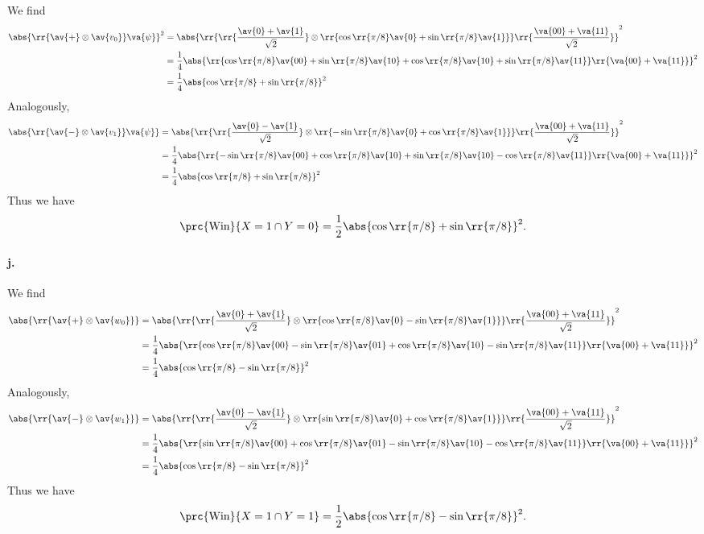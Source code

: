 \documentclass{article}
\begin{document}
We find
\begin{align*}
  \abs{\rr{\av{+}\otimes \av{v_0}}\va{\psi}}^2
  &= \abs{\rr{\rr{\frac{\av{0}+\av{1}}{\sqrt{2}}}\otimes\rr{\cos\rr{\pi/8}\av{0}+\sin\rr{\pi/8}\av{1}}}\rr{\frac{\va{00}+\va{11}}{\sqrt{2}}}}^2 \\
  &= \frac{1}{4}\abs{\rr{\cos\rr{\pi/8}\av{00} + \sin\rr{\pi/8}\av{10} + \cos\rr{\pi/8}\av{10}+\sin\rr{\pi/8}\av{11}}\rr{\va{00}+\va{11}}}^2 \\
  &= \frac{1}{4}\abs{\cos\rr{\pi/8}+\sin\rr{\pi/8}}^2 \\
\end{align*}
Analogously,
\begin{align*}
  \abs{\rr{\av{-}\otimes \av{v_1}}\va{\psi}}
  &= \abs{\rr{\rr{\frac{\av{0}-\av{1}}{\sqrt{2}}}\otimes\rr{-\sin\rr{\pi/8}\av{0}+\cos\rr{\pi/8}\av{1}}}\rr{\frac{\va{00}+\va{11}}{\sqrt{2}}}}^2 \\
  &= \frac{1}{4}\abs{\rr{-\sin\rr{\pi/8}\av{00} + \cos\rr{\pi/8}\av{10} + \sin\rr{\pi/8}\av{10}-\cos\rr{\pi/8}\av{11}}\rr{\va{00}+\va{11}}}^2 \\
  &= \frac{1}{4}\abs{\cos\rr{\pi/8}+\sin\rr{\pi/8}}^2
\end{align*}
Thus we have
\begin{align*}
  \prc{\text{Win}}{X=1\cap Y=0} = \frac{1}{2}\abs{\cos\rr{\pi/8}+\sin\rr{\pi/8}}^2.
\end{align*}

\paragraph{j.}

We find
\begin{align*}
  \abs{\rr{\av{+}\otimes\av{w_0}}} &= \abs{\rr{\rr{\frac{\av{0}+\av{1}}{\sqrt{2}}}\otimes\rr{\cos\rr{\pi/8}\av{0}-\sin\rr{\pi/8}\av{1}}}\rr{\frac{\va{00}+\va{11}}{\sqrt{2}}}}^2 \\
                                   &= \frac{1}{4} \abs{\rr{\cos\rr{\pi/8}\av{00}-\sin\rr{\pi/8}\av{01}+\cos\rr{\pi/8}\av{10}-\sin\rr{\pi/8}\av{11}}\rr{\va{00}+\va{11}}}^2 \\
                                   &= \frac{1}{4} \abs{\cos\rr{\pi/8}-\sin\rr{\pi/8}}^2
\end{align*}
Analogously,
\begin{align*}
  \abs{\rr{\av{-}\otimes\av{w_1}}} &= \abs{\rr{\rr{\frac{\av{0}-\av{1}}{\sqrt{2}}}\otimes\rr{\sin\rr{\pi/8}\av{0}+\cos\rr{\pi/8}\av{1}}}\rr{\frac{\va{00}+\va{11}}{\sqrt{2}}}}^2 \\
                                   &= \frac{1}{4} \abs{\rr{\sin\rr{\pi/8}\av{00}+\cos\rr{\pi/8}\av{01}-\sin\rr{\pi/8}\av{10}-\cos\rr{\pi/8}\av{11}}\rr{\va{00}+\va{11}}}^2 \\
                                   &= \frac{1}{4} \abs{\cos\rr{\pi/8}-\sin\rr{\pi/8}}^2
\end{align*}
Thus we have
\begin{align*}
  \prc{\text{Win}}{X=1\cap Y=1} = \frac{1}{2} \abs{\cos\rr{\pi/8}-\sin\rr{\pi/8}}^2.
\end{align*}
\end{document}
